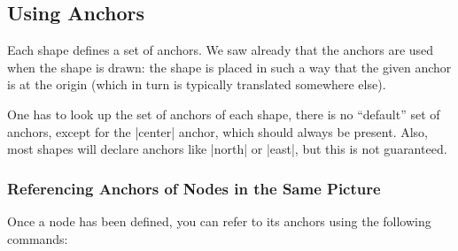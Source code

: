 \subsection{Using Anchors}

Each shape defines a set of anchors. We saw already that the anchors are used
when the shape is drawn: the shape is placed in such a way that the given
anchor is at the origin (which in turn is typically translated somewhere else).

One has to look up the set of anchors of each shape, there is no ``default''
set of anchors, except for the |center| anchor, which should always be present.
Also, most shapes will declare anchors like |north| or |east|, but this is not
guaranteed.


\subsubsection{Referencing Anchors of Nodes in the Same Picture}

Once a node has been defined, you can refer to its anchors using the following
commands:

